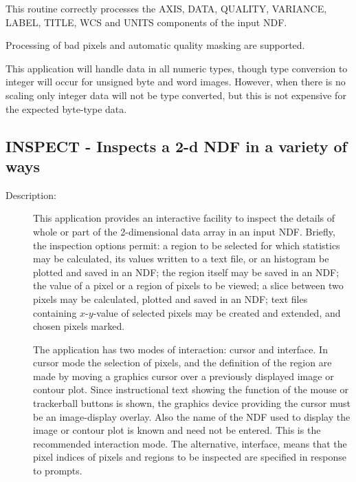 \documentclass[twoside,11pt]{article}
\newcommand{\stardocinitials}  {SUN}
\newcommand{\stardocnumber}    {239.2}
\newcommand{\stardocname}{\stardocinitials /\stardocnumber}
\newcommand{\xlabel}[1]{}
\newlength{\sstbannerlength}
\newlength{\sstcaptionlength}
\newlength{\sstexampleslength}
\newlength{\sstexampleswidth}
\newcommand{\sstroutine}[3]{
   \goodbreak
   \markboth{{\stardocname}~ --- #1}{{\stardocname}~ --- #1}
   \rule{\textwidth}{0.5mm}
   \vspace{-7ex}
   \newline
   \settowidth{\sstbannerlength}{{\Large {\bf #1}}}
   \setlength{\sstcaptionlength}{\textwidth}
   \setlength{\sstexampleslength}{\textwidth}
   \addtolength{\sstbannerlength}{0.5em}
   \addtolength{\sstcaptionlength}{-2.0\sstbannerlength}
   \addtolength{\sstcaptionlength}{-4.9pt}
   \settowidth{\sstexampleswidth}{{\bf Examples:}}
   \addtolength{\sstexampleslength}{-\sstexampleswidth}
   \parbox[t]{\sstbannerlength}{\flushleft{\Large {\bf #1}}}
   \parbox[t]{\sstcaptionlength}{\center{\Large #2}}
   \parbox[t]{\sstbannerlength}{\flushright{\Large {\bf #1}}}
   \begin{description}
      #3
   \end{description}
}
\newcommand{\sstdescription}[1]{\item[Description:] #1}
\newcommand{\sstitem}{\item}
\renewcommand{\sstroutine}[3]{
      \subsection{#1\xlabel{#1}-\label{#1}#2}
      \begin{description}
         #3
      \end{description}
   }
\renewcommand{\sstdescription}[1]{\item[Description:]
      \begin{description}
         #1
      \end{description}
   }
\begin{document}
{{{         \sstitem
         This routine correctly processes the AXIS, DATA, QUALITY,
         VARIANCE, LABEL, TITLE, WCS and UNITS components of the input NDF.

         \sstitem
         Processing of bad pixels and automatic quality masking are
         supported.

         \sstitem
         This application will handle data in all numeric types, though
         type conversion to integer will occur for unsigned byte and word
         images.  However, when there is no scaling only integer data will
         not be type converted, but this is not expensive for the expected
         byte-type data.
      }
   }
}
\sstroutine{
   INSPECT
}{
   Inspects a 2-d NDF in a variety of ways
}{
   \sstdescription{
      This application provides an interactive facility to inspect the
      details of whole or part of the 2-dimensional data array in an input NDF.
      Briefly, the inspection options permit: a region to be selected
      for which statistics may be calculated, its values written to a
      text file, or an histogram be plotted and saved in an NDF; the
      region itself may be saved in an NDF; the value of a pixel or a
      region of pixels to be viewed; a slice between two pixels may be
      calculated, plotted and saved in an NDF; text files containing
      $x$-$y$-value of selected pixels may be created and extended, and
      chosen pixels marked.

      The application has two modes of interaction: cursor and
      interface.  In cursor mode the selection of pixels, and the
      definition of the region are made by moving a graphics cursor
      over a previously displayed image or contour plot.  Since
      instructional text showing the function of the mouse or
      trackerball buttons is shown, the graphics device providing the
      cursor must be an image-display overlay.  Also the name of the
      NDF used to display the image or contour plot is known and need
      not be entered.  This is the recommended interaction mode.  The
      alternative, interface, means that the pixel indices of pixels
      and regions to be inspected are specified in response to prompts.

}}
\end{document}
